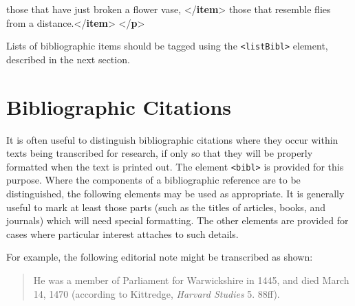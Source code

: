 \documentclass[11pt,twoside]{article}\makeatletter
\makeatletter
\renewcommand\section{\@startsection {section}{1}{\z@}%
     {-1.75ex \@plus -0.5ex \@minus -.2ex}%
     {0.5ex \@plus .2ex}%
     {\reset@font\Large\bfseries\sffamily}}
\def\DivI{\section}
\def\DivI{\chapter}
\makeatother
\begin{document}
\begin{shaded}
\hspace*{6pt} those that have just broken a flower\mbox{}\newline 
\hspace*{6pt}\hspace*{6pt}\hspace*{6pt}\hspace*{6pt} vase, {</\textbf{item}>}\mbox{}\newline 
\hspace*{6pt} those that resemble flies from a\mbox{}\newline 
\hspace*{6pt}\hspace*{6pt}\hspace*{6pt}\hspace*{6pt} distance.{</\textbf{item}>}\mbox{}\newline 
{}\mbox{}\newline 
{</\textbf{p}>}\end{shaded}\egroup\par \par
Lists of bibliographic items should be tagged using the \texttt{<listBibl>} element, described in the next section.
\DivI[Bibliographic Citations]{Bibliographic Citations}\label{U5-bibls}\par
It is often useful to distinguish bibliographic citations where they occur within texts being transcribed for research, if only so that they will be properly formatted when the text is printed out. The element \texttt{<bibl>} is provided for this purpose.  Where the components of a bibliographic reference are to be distinguished, the following elements may be used as appropriate. It is generally useful to mark at least those parts (such as the titles of articles, books, and journals) which will need special formatting.  The other elements are provided for cases where particular interest attaches to such details. \par
For example, the following editorial note might be transcribed as shown: 
\begin{quote}He was a member of Parliament for Warwickshire in 1445, and died March 14, 1470 (according to Kittredge, \textit{Harvard Studies} 5. 88ff).\end{quote}
\end{document}
